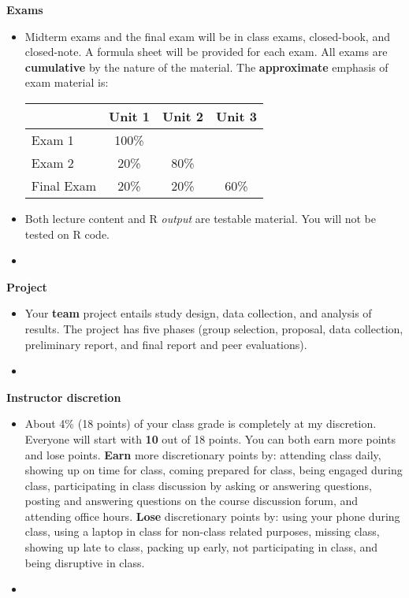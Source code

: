 \documentclass[letterpaper,12pt]{report}
\begin{document}
\textbf{Exams}
\begin{itemize}
\item[]
Midterm exams and the final exam will be in class exams, closed-book, and closed-note. A formula sheet will be provided for each exam. All exams are \textbf{cumulative} by the nature of the material. The \textbf{approximate} emphasis of exam material is:
\begin{center}
\begin{tabular}{lccc}
\hline
            & Unit 1 & Unit 2 & Unit 3 \\
\hline
Exam 1      & 100\%  &        &        \\
Exam 2      & 20\%   &  80\%  &        \\
Final Exam  & 20\%   &  20\%  & 60\%   \\
\hline
\end{tabular}
\end{center}
\item[] Both lecture content and R \emph{output} are testable material.  You will not be tested on R code.
\item[]
\end{itemize}

\textbf{Project}
\begin{itemize}
\item[] Your \textbf{team} project entails study design, data collection, and analysis of results. The project has five phases (group selection, proposal, data collection, preliminary report, and final report and peer evaluations).
\item[]
\end{itemize}

\textbf{Instructor discretion}
\begin{itemize}
\item[]
About 4\% (18 points) of your class grade is completely at my discretion. Everyone will start with \textbf{10} out of 18 points.  You can both earn more points and lose points.  \textbf{Earn} more discretionary points by:  attending class daily, showing up on time for class, coming prepared for class, being engaged during class, participating in class discussion by asking or answering questions, posting and answering questions on the course discussion forum, and attending office hours. \textbf{Lose} discretionary points by: using your phone during class, using a laptop in class for non-class related purposes, missing class, showing up late to class, packing up early, not participating in class, and being disruptive in class.
\item[]
\end{itemize}
\end{document}
